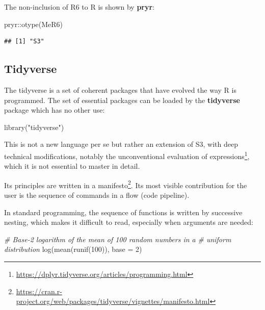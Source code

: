 \documentclass[
  12pt,
  american,
  a4paper,
  extrafontsizes,onecolumn,openright
  ]{memoir}
\newenvironment{Shaded}{\begin{snugshade}}{\end{snugshade}}
\newcommand{\AttributeTok}[1]{\textcolor[rgb]{0.77,0.63,0.00}{#1}}
\newcommand{\CommentTok}[1]{\textcolor[rgb]{0.56,0.35,0.01}{\textit{#1}}}
\newcommand{\DecValTok}[1]{\textcolor[rgb]{0.00,0.00,0.81}{#1}}
\newcommand{\FunctionTok}[1]{\textcolor[rgb]{0.00,0.00,0.00}{#1}}
\newcommand{\NormalTok}[1]{#1}
\newcommand{\SpecialCharTok}[1]{\textcolor[rgb]{0.00,0.00,0.00}{#1}}
\newcommand{\StringTok}[1]{\textcolor[rgb]{0.31,0.60,0.02}{#1}}
\begin{document}
The non-inclusion of R6 to R is shown by \textbf{pryr}:

\scriptsize

\begin{Shaded}
\begin{Highlighting}[]
\NormalTok{pryr}\SpecialCharTok{::}\FunctionTok{otype}\NormalTok{(MeR6)}
\end{Highlighting}
\end{Shaded}

\begin{verbatim}
## [1] "S3"
\end{verbatim}

\normalsize

\hypertarget{tidyverse}{%
\subsection{Tidyverse}\label{tidyverse}}

The tidyverse is a set of coherent packages that have evolved the way R is programmed.
The set of essential packages can be loaded by the \textbf{tidyverse} package which has no other use:

\scriptsize

\begin{Shaded}
\begin{Highlighting}[]
\FunctionTok{library}\NormalTok{(}\StringTok{"tidyverse"}\NormalTok{)}
\end{Highlighting}
\end{Shaded}

\normalsize

This is not a new language per se but rather an extension of S3, with deep technical modifications, notably the unconventional evaluation of expressions\footnote{\url{https://dplyr.tidyverse.org/articles/programming.html}}, which it is not essential to master in detail.

Its principles are written in a manifesto\footnote{\url{https://cran.r-project.org/web/packages/tidyverse/vignettes/manifesto.html}}.
Its most visible contribution for the user is the sequence of commands in a flow (code pipeline).

In standard programming, the sequence of functions is written by successive nesting, which makes it difficult to read, especially when arguments are needed:

\scriptsize

\begin{Shaded}
\begin{Highlighting}[]
\CommentTok{\# Base{-}2 logarithm of the mean of 100 random numbers in a}
\CommentTok{\# uniform distribution}
\FunctionTok{log}\NormalTok{(}\FunctionTok{mean}\NormalTok{(}\FunctionTok{runif}\NormalTok{(}\DecValTok{100}\NormalTok{)), }\AttributeTok{base =} \DecValTok{2}\NormalTok{)}
\end{Highlighting}
\end{Shaded}
\end{document}

